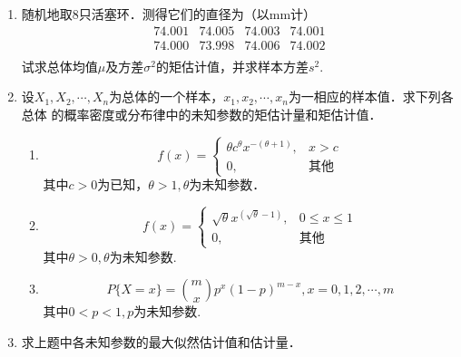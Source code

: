 \documentclass[10pt,a4paper]{article}
\begin{document}
\begin{enumerate}


    \item 随机地取8只活塞环．测得它们的直径为（以mm计）
    $$\begin{array}{cccc}
        74.001 & 74.005 & 74.003 & 74.001 \\
        74.000 & 73.998 & 74.006 & 74.002 \\
    \end{array}$$
    试求总体均值$\mu$及方差$\sigma^2$的矩估计值，并求样本方差$s^2$.
    \clearpage


    \item 设$X_1,X_2,\cdots,X_n$为总体的一个样本，$x_1,x_2,\cdots,x_n$为一相应的样本值．求下列各总体
    的概率密度或分布律中的未知参数的矩估计量和矩估计值．
    \begin{enumerate}
        \item $$f(x)=\left\{\begin{array}{ll}
            \theta c^\theta x^{-(\theta+1)}, & x>c \\
            0, & \mbox{其他}
        \end{array}\right.$$
        其中$c>0$为已知，$\theta>1,\theta$为未知参数．
        \item $$f(x)=\left\{\begin{array}{ll}
            \sqrt{\theta}  x^{(\sqrt{\theta}-1)}, & 0\leq x\leq 1 \\
            0, & \mbox{其他}
        \end{array}\right.$$
        其中$\theta >0,\theta$为未知参数.
        \item $$P\{X=x\}=\binom{m}{x} p^x (1-p)^{m-x},x=0,1,2,\cdots,m$$其中$0<p<1,p$为未知参数. 
    \end{enumerate}
    \clearpage


    \item 求上题中各未知参数的最大似然估计值和估计量．
    \clearpage





\end{enumerate}
\end{document}
